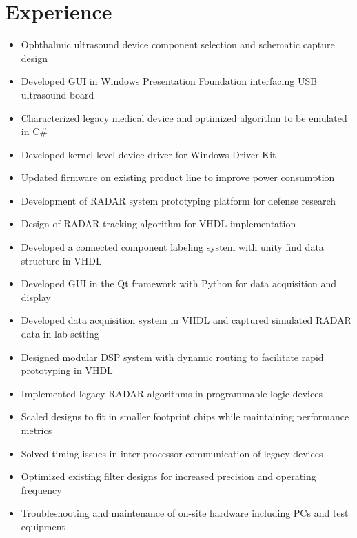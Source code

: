 \documentclass[10pt,letterpaper,roman]{moderncv}
\begin{document}
\makecvtitle

\vspace*{-2\baselineskip}
\section{Experience}

\begin{itemize}
\item Ophthalmic ultrasound device component selection and schematic capture design
\item Developed GUI in Windows Presentation Foundation interfacing USB ultrasound board
\item Characterized legacy medical device and optimized algorithm to be emulated in C\#
\item Developed kernel level device driver for Windows Driver Kit
\item Updated firmware on existing product line to improve power consumption
\end{itemize}
\smallskip

\begin{itemize}
\item Development of RADAR system prototyping platform for defense research
\item Design of RADAR tracking algorithm for VHDL implementation
\item Developed a connected component labeling system with unity find data structure in VHDL
\item Developed GUI in the Qt framework with Python for data acquisition and display
\item Developed data acquisition system in VHDL and captured simulated RADAR data in lab setting
\end{itemize}
\smallskip

\begin{itemize}
\item Designed modular DSP system with dynamic routing to facilitate rapid prototyping in VHDL
\item Implemented legacy RADAR algorithms in programmable logic devices
\item Scaled designs to fit in smaller footprint chips while maintaining performance metrics
\item Solved timing issues in inter-processor communication of legacy devices
\item Optimized existing filter designs for increased precision and operating frequency
\item Troubleshooting and maintenance of on-site hardware including PCs and test equipment
\end{itemize}
\smallskip
\end{document}
